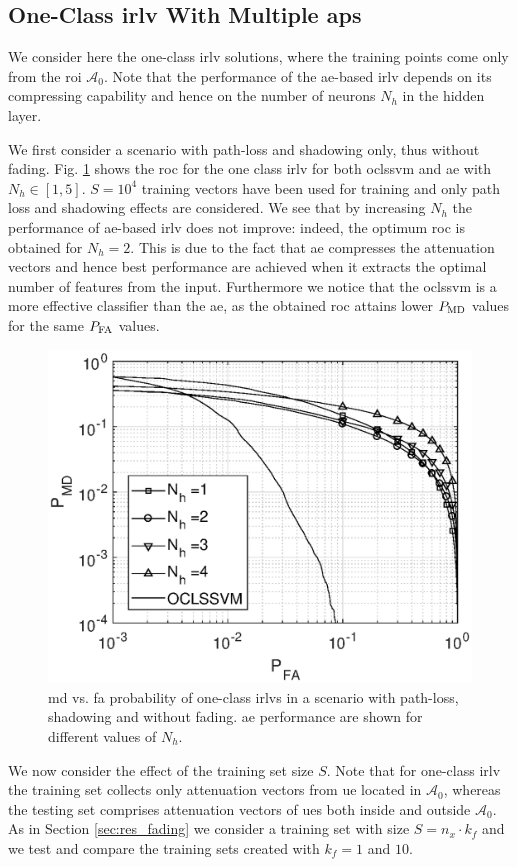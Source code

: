 \documentclass[draftcls,onecolumn,12pt]{IEEEtran}
\begin{document}
\subsection{One-Class \ac{irlv} With Multiple \acp{ap}}


We consider here the one-class \ac{irlv} solutions, where the training points come only from the \ac{roi} $\mathcal A_0$. Note that the performance of the  \ac{ae}-based \ac{irlv} depends on its compressing capability and hence on the number of neurons $N_h$ in the hidden layer.  

We first consider a scenario with path-loss and shadowing only, thus without fading. Fig. \ref{fig:aeNh} shows the \ac{roc} for the one class \ac{irlv} for both \ac{oclssvm} and \ac{ae} with $N_h \in [1, 5]$. $S=10^4$ training vectors have been used for training and only path loss and shadowing effects are considered. We see that by increasing $N_h$ the performance of \ac{ae}-based \ac{irlv} does not improve: indeed, the optimum \ac{roc} is obtained for $N_h=2$. This is due to the fact that  \ac{ae} compresses the attenuation vectors and hence best performance are achieved when it  extracts the optimal number of features from the input. Furthermore we notice that the \ac{oclssvm} is a more effective classifier than the \ac{ae}, as the obtained \ac{roc} attains lower $P_{\rm MD}$ values for the same $P_{\rm FA}$ values.

\begin{figure}[t]
    \centering
    \includegraphics[width=0.6\columnwidth]{res_ae_onNeur.eps}
    \caption{\ac{md} vs. \ac{fa} probability of one-class \acp{irlv} in a scenario with path-loss, shadowing and without fading. \ac{ae} performance are shown for different values of $N_h$.}
    \label{fig:aeNh}
\end{figure}
 
We now consider the effect of the training set size $S$. Note that for one-class \ac{irlv} the training set collects only attenuation vectors from \ac{ue} located in $\mathcal{A}_0$, whereas the testing set comprises attenuation vectors of \acp{ue} both inside and outside $\mathcal A_0$. As in Section \ref{sec:res_fading} we consider a training set with size $S = n_x \cdot k_f$ and we test and compare the training sets created with $k_f=1$ and $10$.
\end{document}
